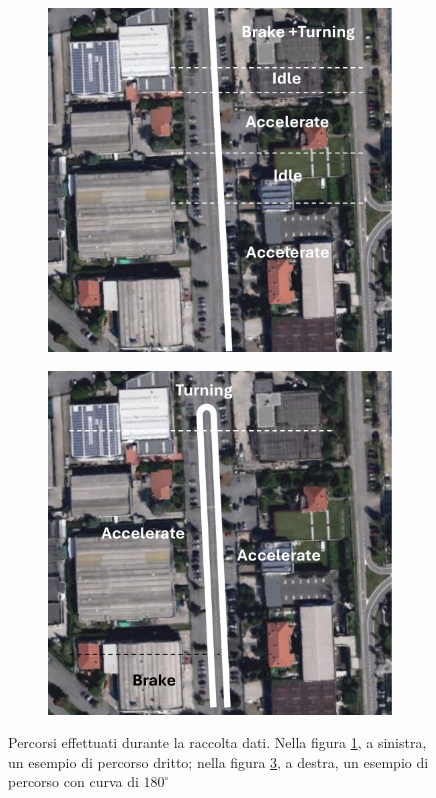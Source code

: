 \documentclass[class=article]{standalone}
\begin{document}
	\begin{center}
		\begin{figure}[h!]
			\begin{subfigure}[h]{.5\textwidth}
				\centering\includegraphics[width=.9\textwidth]{img/percorsoDritto}
				\caption{}
				\label{fig:percorsoDritto}
			\end{subfigure}
			\begin{subfigure}[h]{.5\textwidth}
				\centering\includegraphics[width=.9\textwidth]{img/percorsoCurvo}
				\caption{}
				\label{fig:percorsoCurvo}
			\end{subfigure}
			\caption[]{Percorsi effettuati durante la raccolta dati. Nella figura \ref{fig:percorsoDritto}, a sinistra, un esempio di percorso dritto; nella figura \ref{fig:percorsoCurvo}, a destra, un esempio di percorso con curva di \(180^\circ\)}
		\end{figure}
	\end{center}
	
\end{document}
